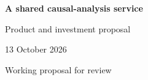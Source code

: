 \documentclass[11pt,a4paper]{article}
\begin{document}
\begin{center}{\LARGE\bfseries A shared causal-analysis service\par}\vspace{3mm}
{\large Product and investment proposal\par}\vspace{2mm}
13 October 2026\par Working proposal for review
\end{center}

\clearpage


\end{document}
